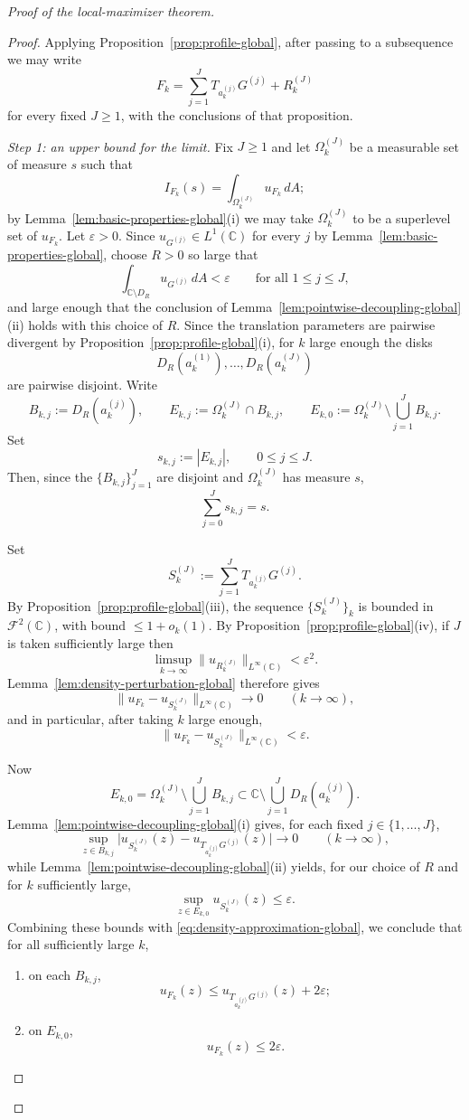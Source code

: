 \documentclass[a4paper,11pt,reqno]{amsart}
\numberwithin{equation}{section}
\theoremstyle{plain} %
\theoremstyle{definition} %
\theoremstyle{remark}
\newcommand{\C}{\mathbb{C}}
\begin{document}
\begin{proof}[Proof of the local-maximizer theorem]
\begin{proof}
Applying Proposition~\ref{prop:profile-global}, after passing to a
subsequence we may write
\[
F_k=\sum_{j=1}^J T_{a_k^{(j)}}G^{(j)}+R_k^{(J)}
\]
for every fixed \(J\ge 1\), with the conclusions of that proposition.

\medskip
\noindent\emph{Step 1: an upper bound for the limit.}
Fix \(J\ge 1\) and let \(\Omega_k^{(J)}\) be a measurable set of measure
\(s\) such that
\[
I_{F_k}(s)=\int_{\Omega_k^{(J)}} u_{F_k}\,dA;
\]
by Lemma~\ref{lem:basic-properties-global}(i) we may take
\(\Omega_k^{(J)}\) to be a superlevel set of \(u_{F_k}\). Let
\(\varepsilon>0\). Since \(u_{G^{(j)}}\in L^1(\C)\) for every \(j\) by
Lemma~\ref{lem:basic-properties-global}, choose \(R>0\) so large that
\[
\int_{\C\setminus D_R} u_{G^{(j)}}\,dA<\varepsilon
\qquad\text{for all } 1\le j\le J,
\]
and large enough that the conclusion of
Lemma~\ref{lem:pointwise-decoupling-global}(ii) holds with this choice of
\(R\). Since the translation parameters are pairwise divergent by
Proposition~\ref{prop:profile-global}(i), for \(k\) large enough the disks
\[
D_R(a_k^{(1)}),\dots,D_R(a_k^{(J)})
\]
are pairwise disjoint. Write
\[
B_{k,j}:=D_R(a_k^{(j)}),
\qquad
E_{k,j}:=\Omega_k^{(J)}\cap B_{k,j},
\qquad
E_{k,0}:=\Omega_k^{(J)}\setminus \bigcup_{j=1}^J B_{k,j}.
\]
Set
\[
s_{k,j}:=|E_{k,j}|,
\qquad 0\le j\le J.
\]
Then, since the \(\{B_{k,j}\}_{j=1}^J\) are disjoint and
\(\Omega_k^{(J)}\) has measure \(s\),
\[
\sum_{j=0}^J s_{k,j}=s.
\]

Set
\[
S_k^{(J)}:=\sum_{j=1}^J T_{a_k^{(j)}}G^{(j)}.
\]
By Proposition~\ref{prop:profile-global}(iii), the sequence
\(\{S_k^{(J)}\}_k\) is bounded in \(\mathcal F^2(\C)\), with bound
\(\le 1+o_k(1)\). By Proposition~\ref{prop:profile-global}(iv), if \(J\) is
taken sufficiently large then
\[
\limsup_{k\to\infty}\|u_{R_k^{(J)}}\|_{L^\infty(\C)}<\varepsilon^2.
\]
Lemma~\ref{lem:density-perturbation-global} therefore gives
\[
\|u_{F_k}-u_{S_k^{(J)}}\|_{L^\infty(\C)}\to 0
\qquad (k\to\infty),
\]
and in particular, after taking \(k\) large enough,
\begin{equation}\label{eq:density-approximation-global}
\|u_{F_k}-u_{S_k^{(J)}}\|_{L^\infty(\C)}<\varepsilon.
\end{equation}

Now
\[
E_{k,0}
=
\Omega_k^{(J)}\setminus \bigcup_{j=1}^J B_{k,j}
\subset
\C\setminus \bigcup_{j=1}^J D_R(a_k^{(j)}).
\]
Lemma~\ref{lem:pointwise-decoupling-global}(i) gives, for each fixed
\(j\in\{1,\dots,J\}\),
\[
\sup_{z\in B_{k,j}}
\big|u_{S_k^{(J)}}(z)-u_{T_{a_k^{(j)}}G^{(j)}}(z)\big|\to 0
\qquad (k\to\infty),
\]
while Lemma~\ref{lem:pointwise-decoupling-global}(ii) yields, for our
choice of \(R\) and for \(k\) sufficiently large,
\[
\sup_{z\in E_{k,0}}u_{S_k^{(J)}}(z)\le \varepsilon.
\]
Combining these bounds with \eqref{eq:density-approximation-global}, we
conclude that for all sufficiently large \(k\),
\begin{enumerate}
\item[(a)] on each \(B_{k,j}\),
\[
u_{F_k}(z)\le u_{T_{a_k^{(j)}}G^{(j)}}(z)+2\varepsilon;
\]
\item[(b)] on \(E_{k,0}\),
\[
u_{F_k}(z)\le 2\varepsilon.
\]
\end{enumerate}


\end{proof}
\end{proof}
\end{document}
